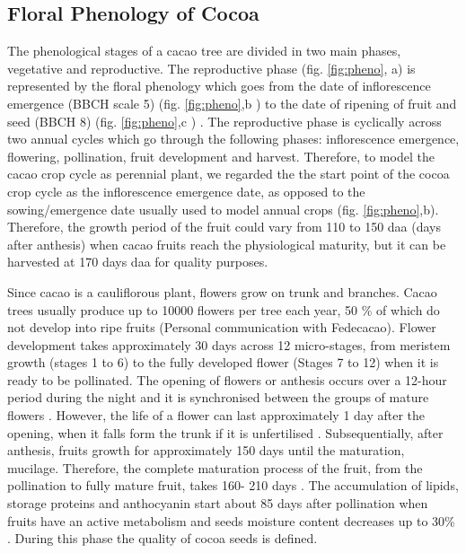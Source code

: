 \documentclass[gene,journal,article,submit,moreauthors,pdftex]{Definitions/mdpi}
\begin{document}
\subsection{Floral Phenology of Cocoa}


The phenological stages of a cacao tree are divided in two main phases, vegetative and reproductive. The reproductive phase (fig. \ref{fig:pheno}, a) is represented by the floral phenology which goes from the date of inflorescence emergence (BBCH scale 5) (fig. \ref{fig:pheno},b ) to the date of ripening of fruit and seed (BBCH 8) (fig. \ref{fig:pheno},c ) \citep{Niemenak2010}. The reproductive phase is cyclically across two annual cycles which go through the following phases: inflorescence emergence, flowering, pollination, fruit development and harvest. Therefore, to model the cacao crop cycle as perennial plant, we regarded the the start point of the cocoa crop cycle as the inflorescence emergence date, as opposed to the sowing/emergence date usually used to model annual crops (fig. \ref{fig:pheno},b). Therefore, the growth period of the fruit could vary from 110 to 150 daa (days after anthesis) \citep{lopez2018} when cacao fruits reach the physiological maturity, but it can be harvested at 170 days daa \citep{Niemenak2010} for quality purposes.

Since cacao is a cauliflorous plant, flowers grow on trunk and branches. Cacao trees usually produce up to 10000 flowers per tree each year, 50 \%  of which do not develop into ripe fruits (Personal communication with Fedecacao). Flower development takes approximately 30 days across 12 micro-stages, from meristem growth (stages 1 to 6) to the fully developed flower (Stages 7 to 12) \citep{swanson2005, lopez2018} when it is ready to be pollinated. The opening of flowers or anthesis  occurs over a 12-hour period during the night and it is synchronised between the groups of mature flowers \citep{Niemenak2010}. However, the life of a flower can last approximately 1 day after the opening, when it falls form the trunk if it is unfertilised \citep{cheesman1927, Niemenak2010}. Subsequentially, after anthesis, fruits growth for approximately 150 days until the maturation, mucilage. Therefore, the complete maturation process of the fruit, from the pollination to fully mature fruit, takes 160- 210 days \citep{berry1994}. The accumulation of lipids, storage proteins and anthocyanin start about 85 days after pollination when fruits have an active metabolism and seeds moisture content decreases up to 30\% \citep{Lehrian1980, Niemenak2010}. During this phase the quality of cocoa seeds is defined.
\end{document}
